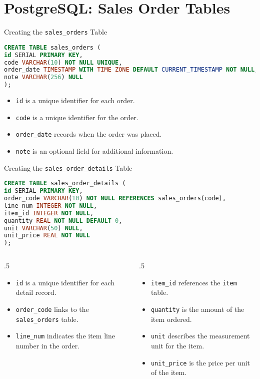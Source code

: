 \documentclass[aspectratio=169, table]{beamer}
\begin{document}
\section{PostgreSQL: Sales Order Tables}
\begin{frame}[fragile]{Creating the \texttt{sales\_orders} Table}
\vspace{15pt}
\begin{lstlisting}[language=Sql]
CREATE TABLE sales_orders (
id SERIAL PRIMARY KEY,
code VARCHAR(10) NOT NULL UNIQUE,
order_date TIMESTAMP WITH TIME ZONE DEFAULT CURRENT_TIMESTAMP NOT NULL,
note VARCHAR(256) NULL
);
\end{lstlisting}

\begin{itemize}
\item \texttt{id} is a unique identifier for each order.
\item \texttt{code} is a unique identifier for the order.
\item \texttt{order\_date} records when the order was placed.
\item \texttt{note} is an optional field for additional information.
\end{itemize}
\end{frame}

\begin{frame}[fragile]{Creating the \texttt{sales\_order\_details} Table}
\vspace{15pt}
\begin{lstlisting}[language=Sql]
CREATE TABLE sales_order_details (
id SERIAL PRIMARY KEY,
order_code VARCHAR(10) NOT NULL REFERENCES sales_orders(code),
line_num INTEGER NOT NULL,
item_id INTEGER NOT NULL,
quantity REAL NOT NULL DEFAULT 0,
unit VARCHAR(50) NULL,
unit_price REAL NOT NULL
);
\end{lstlisting}
\vspace{-20pt}
\begin{columns}[t]
\begin{column}{.5\pagewidth}
	\begin{itemize}
		\item \texttt{id} is a unique identifier for each detail record.
		\item \texttt{order\_code} links to the \texttt{sales\_orders} table.
		\item \texttt{line\_num} indicates the item line number in the order.
	\end{itemize}
\end{column}
\begin{column}{.5\pagewidth}
	\begin{itemize}
		\item \texttt{item\_id} references the \texttt{item} table.
		\item \texttt{quantity} is the amount of the item ordered.
		\item \texttt{unit} describes the measurement unit for the item.
		\item \texttt{unit\_price} is the price per unit of the item.
	\end{itemize}
\end{column}
\end{columns}
\end{frame}
\end{document}
